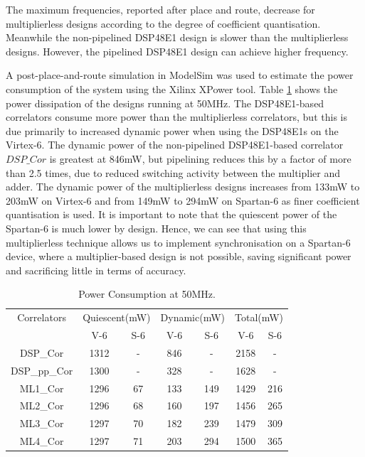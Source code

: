The maximum frequencies, reported after place and route, decrease for multiplierless designs according to the degree of coefficient quantisation. 
Meanwhile the non-pipelined DSP48E1 design is slower than the multiplierless designs. 
However, the pipelined DSP48E1 design can achieve higher frequency.

A post-place-and-route simulation in ModelSim was used to estimate the power consumption of the system using the Xilinx XPower tool. 
Table \ref{tab:PWR} shows the power dissipation of the designs running at 50{\thinspace}MHz. 
The DSP48E1-based correlators consume more power than the multiplierless correlators, but this is due primarily to increased dynamic power when using the DSP48E1s on the Virtex-6. 
The dynamic power of the non-pipelined DSP48E1-based correlator $DSP\_Cor$ is greatest at 846{\thinspace}mW, but pipelining reduces this by a factor of more than 2.5 times, due to reduced switching activity between the multiplier and adder.  
The dynamic power of the multiplierless designs increases from 133{\thinspace}mW to 203{\thinspace}mW on Virtex-6 and from 149{\thinspace}mW to 294{\thinspace}mW on Spartan-6 as finer coefficient quantisation is used. 
It is important to note that the quiescent power of the Spartan-6 is much lower by design. 
Hence, we can see that using this multiplierless technique allows us to implement synchronisation on a Spartan-6 device, where a multiplier-based design is not possible, saving significant power and sacrificing little in terms of accuracy.

\begin{table}[h]
	\centering
	\caption{Power Consumption at 50MHz.}
	\label{tab:PWR}
	\begin{tabular}{c|c|c|c|c|c|c}
        \hline \hline
    			Correlators  & \multicolumn{2}{|c|}{Quiescent(mW)} &  \multicolumn{2}{|c|}{Dynamic(mW) }& \multicolumn{2}{|c}{Total(mW)} \\
	\cline{2-7}			& V-6 & S-6 & V-6 & S-6 & V-6 & S-6\\
	\hline
			DSP\_Cor		&  1312 &  -  	 & 846 & -	& 2158 &-\\
			DSP\_pp\_Cor 	& 1300  &  -   & 328 & - 	& 1628 & -\\
 			ML1\_Cor 		& 1296  & 67 & 133 & 149	& 1429 & 216\\
			ML2\_Cor 		& 1296  & 68 & 160 & 197	& 1456 & 265\\	
			ML3\_Cor 		& 1297  & 70 & 182 & 239	& 1479 & 309\\
			ML4\_Cor 		& 1297  & 71 & 203 & 294    & 1500 & 365\\   
    
    	\hline \hline  
    \end{tabular}
\end{table}


